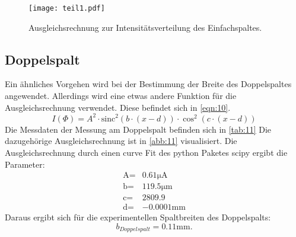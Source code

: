 \label{sec:Auswertung}
\begin{figure}[H]    
    \centering
    \caption{Ausgleichsrechnung zur Intensitätsverteilung des Einfachspaltes.}
    \label{abb:10}
    \texttt{[image: teil1.pdf]}
\end{figure}





\subsection{Doppelspalt}
Ein ähnliches Vorgehen wird bei der Bestimmung der Breite des Doppelspaltes
angewendet. Allerdings wird eine etwas andere Funktion für die Ausgleichsrechnung
verwendet. Diese befindet sich in \autoref{eqn:10}.
\begin{equation}
    \label{eqn:10}
    I\left(\Phi\right) = A^2 \cdot \text{sinc}^2\left(b \cdot \left(x - d\right)\right)  \cdot \cos^2{\left(c \cdot \left(x - d\right)\right)}
\end{equation}
\noindent Die Messdaten der Messung am Doppelspalt befinden sich in \autoref{tab:11}
Die dazugehörige Ausgleichsrechnung ist in \autoref{abb:11} visualisiert.
Die Ausgleichsrechnung durch einen curve Fit des python Paketes scipy ergibt
die Parameter:
\begin{align}
    \text{A} = & 0.61 \unit{\micro\ampere} \\
    \text{b} = & 119.5 \unit{\micro\meter}\\
    \text{c} = & 2809.9     \\
    \text{d} = & -0.0001   \unit{\milli\meter}
\end{align}
\noindent Daraus ergibt sich für die experimentellen Spaltbreiten des Doppelspalts:
\begin{equation}
    b_{Doppelspalt} = 0.11 \unit{\milli\meter}.
\end{equation}
\noindent
